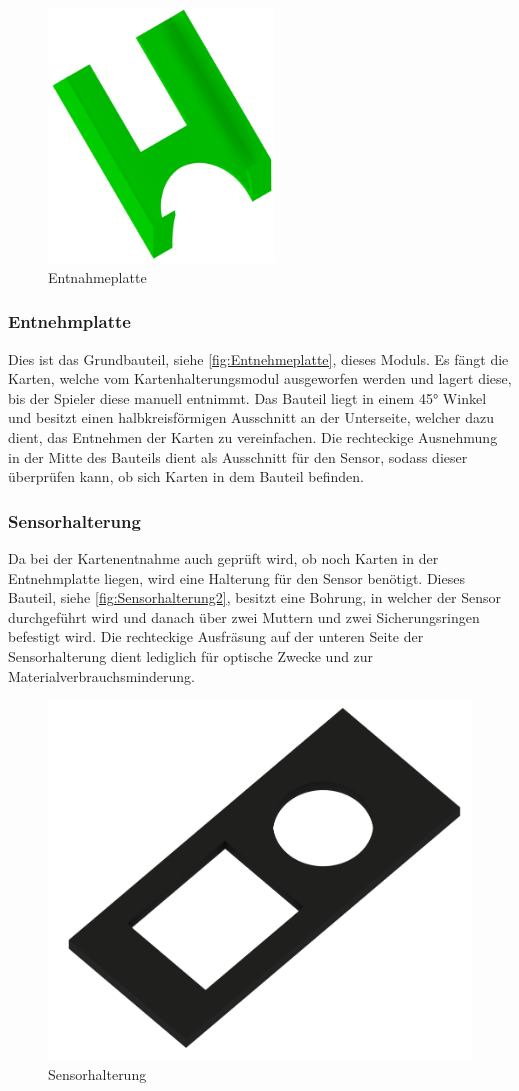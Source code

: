\begin{figure}
    \includegraphics[width = 6cm]{fig/mech/Ausgabefach.png}
    \caption{Entnahmeplatte}
    \label{fig:Entnehmeplatte}
\end{figure}
\subsubsection{Entnehmplatte}

Dies ist das Grundbauteil, siehe \autoref{fig:Entnehmeplatte}, dieses Moduls.
Es fängt die Karten, welche vom Kartenhalterungsmodul ausgeworfen werden und lagert diese, bis
der Spieler diese manuell entnimmt.
Das Bauteil liegt in einem 45° Winkel und besitzt einen halbkreisförmigen Ausschnitt
an der Unterseite, welcher dazu dient, das Entnehmen der Karten zu vereinfachen.
Die rechteckige Ausnehmung in der Mitte des
Bauteils dient als Ausschnitt für den Sensor, sodass dieser überprüfen kann, ob sich Karten in dem Bauteil befinden.


\subsubsection{Sensorhalterung}

Da bei der Kartenentnahme auch geprüft wird, ob noch Karten in der Entnehmplatte liegen, wird eine Halterung für den
Sensor benötigt.
Dieses Bauteil, siehe \autoref{fig:Sensorhalterung2}, besitzt eine Bohrung, in welcher der Sensor durchgeführt wird und danach über zwei Muttern und
zwei Sicherungsringen befestigt wird.
Die rechteckige Ausfräsung auf der unteren Seite der Sensorhalterung dient lediglich für optische Zwecke und zur Materialverbrauchsminderung.

\begin{figure}[H]
    \centering
    \includegraphics[width=8 cm]{fig/mech/SensorStuetze.png}
    \caption{Sensorhalterung}
    \label{fig:Sensorhalterung2}
\end{figure}


